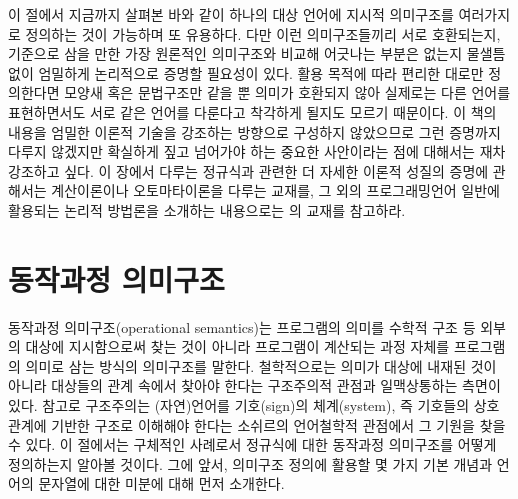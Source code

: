 이 절에서 지금까지 살펴본 바와 같이 하나의 대상 언어에 지시적 의미구조를
여러가지로 정의하는 것이 가능하며 또 유용하다. 다만 이런 의미구조들끼리
서로 호환되는지, 기준으로 삼을 만한 가장 원론적인 의미구조와 비교해
어긋나는 부분은 없는지 물샐틈없이 엄밀하게 논리적으로 증명할 필요성이 있다.
활용 목적에 따라 편리한 대로만 정의한다면 모양새 혹은
문법구조만 같을 뿐 의미가 호환되지 않아 실제로는 다른 언어를 표현하면서도
서로 같은 언어를 다룬다고 착각하게 될지도 모르기 때문이다. 이 책의 내용을
엄밀한 이론적 기술을 강조하는 방향으로 구성하지 않았으므로 그런 증명까지
다루지 않겠지만 확실하게 짚고 넘어가야 하는 중요한 사안이라는 점에 대해서는
재차 강조하고 싶다. 이 장에서 다루는 정규식과 관련한 더 자세한 이론적
성질의 증명에 관해서는 계산이론이나 오토마타이론을 다루는
교재\cite{Sipser2013,Hopcroft2007}를, 그 외의 프로그래밍언어 일반에
활용되는 논리적 방법론을 소개하는 내용으로는 \citet{PFPL2nd}의 교재를
참고하라.


\section{동작과정 의미구조}
동작과정 의미구조(operational semantics)는
프로그램의 의미를 수학적 구조 등 외부의 대상에 지시함으로써 찾는 것이
아니라 프로그램이 계산되는 과정 자체를 프로그램의 의미로 삼는 방식의
의미구조를 말한다. 철학적으로는 의미가 대상에 내재된 것이 아니라 대상들의
관계 속에서 찾아야 한다는 구조주의적 관점과 일맥상통하는 측면이 있다.
참고로 구조주의는 (자연)언어를 기호(sign)의 체계(system), 즉 기호들의
상호관계에 기반한 구조로 이해해야 한다는 소쉬르\cite{Saussure1916}의
언어철학적 관점에서 그 기원을 찾을 수 있다. 이 절에서는 구체적인
사례로서 정규식에 대한 동작과정 의미구조를 어떻게 정의하는지 알아볼
것이다. 그에 앞서, 의미구조 정의에 활용할 몇 가지 기본 개념과
언어의 문자열에 대한 미분에 대해 먼저 소개한다.

